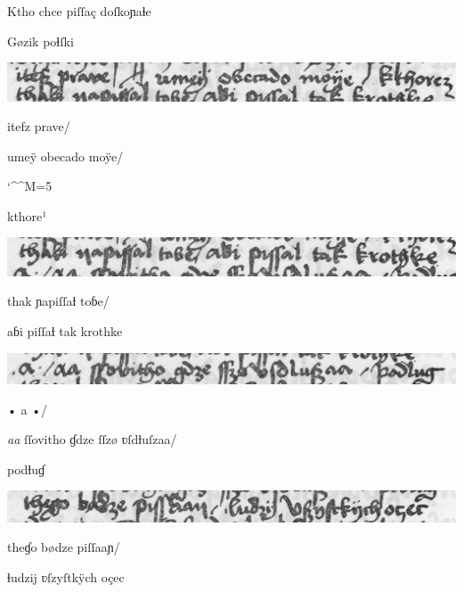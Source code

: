 Ktho chce piſſaç doſkoɲaɬe

\indentVerse Gøzik poɬſki

\includegraphics[width=\hsize]{wierszP2}

\splitverse

itefz prave/

\indentVerse umeÿ obecado moÿe/

	

\catcode `\^^M=5
\obeylines

\indentVerse kthore¹



\includegraphics[width=\hsize]{wierszP3}


\splitverse

thak ɲapiſſaƚ toɓe/	

\indentVerse  aɓi piſſaƚ tak krothke 

\includegraphics[width=\hsize]{wierszP4}

\splitverse

• a •/

\indentVerse  \textit{aa} ſſovitho ɠdze ſſzø ʋſdƚuſzaa/

\indentVerse  podƚuɠ 

\includegraphics[width=\hsize]{wierszP5}

\splitverse

theɠo bødze piſſaaɲ/

\indentVerse ɬudzij ʋſzyſtkÿch oçec 

